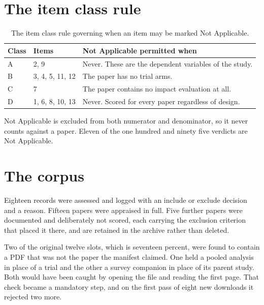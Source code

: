 \documentclass{article}
\begin{document}
\section{The item class rule}
\label{app:classes}

\begin{table}[h]
  \caption{The item class rule governing when an item may be marked Not Applicable.}
  \label{tab:classes}
  \centering
  \small
  \begin{tabular}{llp{7.4cm}}
    \toprule
    Class & Items & Not Applicable permitted when \\
    \midrule
    A & 2, 9              & Never. These are the dependent variables of the study. \\
    B & 3, 4, 5, 11, 12   & The paper has no trial arms. \\
    C & 7                 & The paper contains no impact evaluation at all. \\
    D & 1, 6, 8, 10, 13   & Never. Scored for every paper regardless of design. \\
    \bottomrule
  \end{tabular}
\end{table}

Not Applicable is excluded from both numerator and denominator, so it never counts against a paper.
Eleven of the one hundred and ninety five verdicts are Not Applicable.

\section{The corpus}
\label{app:corpus}

Eighteen records were assessed and logged with an include or exclude decision and a reason. Fifteen
papers were appraised in full. Five further papers were documented and deliberately not scored,
each carrying the exclusion criterion that placed it there, and are retained in the archive rather
than deleted.

Two of the original twelve slots, which is seventeen percent, were found to contain a PDF that was
not the paper the manifest claimed. One held a pooled analysis in place of a trial and the other a
survey companion in place of its parent study. Both would have been caught by opening the file and
reading the first page. That check became a mandatory step, and on the first pass of eight new
downloads it rejected two more.
\end{document}
